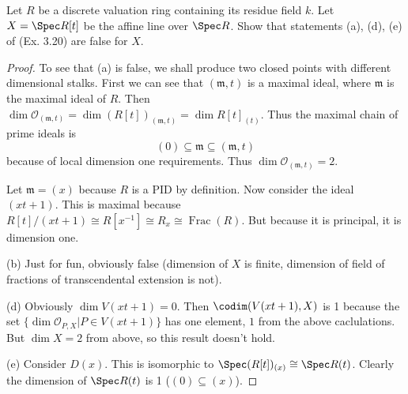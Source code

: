 \begin{exercise}
	Let $R $ be a discrete valuation ring containing its residue field $k $. Let $X = \Spec R[t]$ be the affine line over $\Spec R $. Show that statements (a), (d), (e) of (Ex. 3.20) are false for $X $.
\end{exercise}
\begin{proof}
	To see that (a) is false, we shall produce two closed points with different dimensional stalks.
	First we can see that $(\mathfrak{m},t) $ is a maximal ideal, where $\mathfrak{m} $ is the maximal ideal of $R $.
	Then $\dim \mathcal{O}_{(\mathfrak{m},t)} = \dim (R[t])_{(\mathfrak{m},t)} = \dim R[t]_{(t)}$.
	Thus the maximal chain of prime ideals is
	\[
		(0) \subseteq \mathfrak{m} \subseteq (\mathfrak{m},t)
	\] 
	because of local dimension one requirements.
	Thus $\dim \mathcal{O}_{(\mathfrak{m},t)} = 2 $.

	Let $\mathfrak{m} = (x) $ because $R $ is a PID by definition.
	Now consider the ideal $(xt+1) $.
	This is maximal because $R[t] / (xt+1) \cong R[x^{-1}] \cong R_x \cong \operatorname{Frac}(R) $.
	But because it is principal, it is dimension one.

	(b) Just for fun, obviously false (dimension of $X $ is finite, dimension of field of fractions of transcendental extension is not).

	(d) Obviously $\dim V(xt+1) = 0 $.
	Then $\codim(V(xt+1),X) $ is 1 because the set $\{\dim \mathscr{O}_{P,X}|P\in V(xt+1)\}   $ has one element, $1 $ from the above caclulations.
	But $\dim X = 2 $ from above, so this result doesn't hold.

	(e) Consider $D(x) $.
	This is isomorphic to $\Spec (R[t])_{(x)} \cong \Spec R(t) $.
	Clearly the dimension of $\Spec R(t) $ is 1 ($(0) \subseteq (x) $).
\end{proof}

